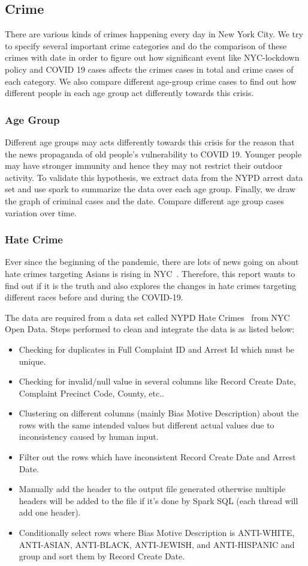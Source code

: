 \documentclass[conference]{IEEEtran}
\begin{document}
\subsection{Crime}
There are various kinds of crimes happening every day in New York City. We try to specify several important crime categories and do the comparison of these crimes with date in order to figure out how significant event like NYC-lockdown policy and COVID 19 cases affects the crimes cases in total and crime cases of each category. We also compare different age-group crime cases to find out how different people in each age group act differently towards this crisis.

\subsubsection{Age Group}
Different age groups may acts differently towards this crisis for the reason that the news propaganda of old people's vulnerability to COVID 19. Younger people may have stronger immunity and hence they may not restrict their outdoor activity. To validate this hypothesis, we extract data from the NYPD arrest data set and use spark to summarize the data over each age group. Finally, we draw the graph of criminal cases and the date. Compare different age group cases variation over time.

\subsubsection{Hate Crime}
Ever since the beginning of the pandemic, there are lots of news going on about hate crimes targeting Asians is rising in NYC~\cite{irene2020hatecrimes}. Therefore, this report wants to find out if it is the truth and also explores the changes in hate crimes targeting different races before and during the COVID-19.

The data are required from a data set called NYPD Hate Crimes~\cite{NYPD2020hatecrimes} from NYC Open Data. Steps performed to clean and integrate the data is as listed below:
\begin{itemize}
    \item Checking for duplicates in Full Complaint ID and Arrest Id which must be unique.
    \item Checking for invalid/null value in several columns like Record Create Date,	Complaint Precinct Code, County, etc..
    \item Clustering on different columns (mainly Bias Motive Description) about the rows with the same intended values but different actual values due to inconsistency caused by human input.
    \item Filter out the rows which have inconsistent Record Create Date and Arrest Date.
    \item Manually add the header to the output file generated otherwise multiple headers will be added to the file if it's done by Spark SQL (each thread will add one header). 
    \item Conditionally select rows where Bias Motive Description is ANTI-WHITE, ANTI-ASIAN, ANTI-BLACK, ANTI-JEWISH, and ANTI-HISPANIC and group and sort them by Record Create Date.
\end{itemize}
\end{document}

